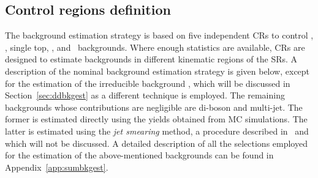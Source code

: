 		\subsection{Control regions definition}
		\label{subsec:crs}

			The background estimation strategy is based on five independent \acp{CR} to control \Zjets, \ttbar, single top, \Wjets, and \ttZ\ backgrounds. Where enough statistics are available, \acp{CR} are designed to estimate backgrounds in different kinematic regions of the \acp{SR}. A description of the nominal background estimation strategy is given below, except for the estimation of the irreducible background \ttZ, which will be discussed in Section~\ref{sec:ddbkgest} as a different technique is employed. The remaining backgrounds whose contributions are negligible are di-boson and multi-jet. The former is estimated directly using the yields obtained from \ac{MC} simulations. The latter is estimated using the \emph{jet smearing} method, a procedure described in~\cite{Aad:2012fqa} and~\cite{calumThesis} which will not be discussed. A detailed description of all the selections employed for the estimation of the above-mentioned backgrounds can be found in Appendix~\ref{app:sumbkgest}. 

